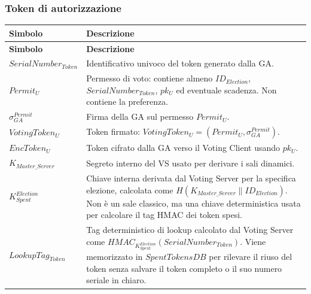\documentclass[a4paper,12pt]{article}
\begin{document}
\subsubsection{Token di autorizzazione}

\begin{longtable}{|>{\raggedright\arraybackslash}p{}|>{\raggedright\arraybackslash}p{}|}
	\hline
	\rowcolor{HeaderBlue}\textbf{Simbolo} & \textbf{Descrizione}                                                                                                                 \\
	\hline
	\endfirsthead
	\hline
	\rowcolor{HeaderBlue}\textbf{Simbolo} & \textbf{Descrizione}                                                                                                                 \\
	\hline
	\endhead
	$SerialNumber_{Token}$                & Identificativo univoco del token generato dalla GA.                                                                                  \\
	\hline
	$Permit_U$                            & Permesso di voto: contiene almeno $ID_{Election}$, $SerialNumber_{Token}$, $pk_U$ ed eventuale scadenza. Non contiene la preferenza. \\
	\hline
	$\sigma_{GA}^{Permit}$                & Firma della GA sul permesso $Permit_U$.                                                                                              \\
	\hline
	$VotingToken_U$                       & Token firmato: $VotingToken_U = (Permit_U, \sigma_{GA}^{Permit})$.                                                                   \\
	\hline
	$EncToken_U$                          & Token cifrato dalla GA verso il Voting Client usando $pk_U$.                                                                         \\
	\hline
	$K_{Master\_Server}$                  & Segreto interno del VS usato per derivare i sali dinamici.                                                                            \\
	\hline
	\(K_{Spent}^{Election}\)              & Chiave interna derivata dal Voting Server per la specifica elezione, calcolata come \(H(K_{Master\_Server} \parallel ID_{Election})\). Non \`e un sale classico, ma una chiave deterministica usata per calcolare il tag HMAC dei token spesi. \\
	\hline
	\(LookupTag_{Token}\)                 & Tag deterministico di lookup calcolato dal Voting Server come \(HMAC_{K_{Spent}^{Election}}(SerialNumber_{Token})\). Viene memorizzato in \(SpentTokensDB\) per rilevare il riuso del token senza salvare il token completo o il suo numero seriale in chiaro. \\
	\hline
\end{longtable}
\end{document}
